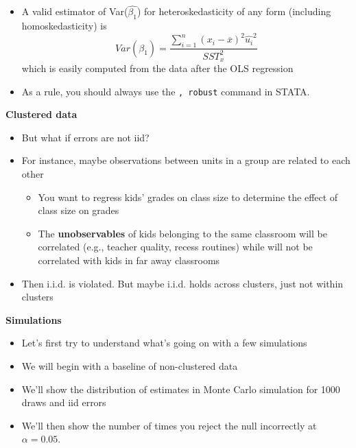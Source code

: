 \documentclass[notes=show]{beamer}
\begin{document}
\begin{frame}[plain]

	\begin{itemize}
	\item A valid estimator of Var($\widehat{\beta_1}$) for heteroskedasticity of any form (including homoskedasticity) is $$Var(\widehat{\beta_1}) = \frac{\sum_{i=1}^n (x_i - \overline{x})^2 \widehat{u_i}^2}{SST_x^2}$$which is easily computed from the data after the OLS regression
	\item As a rule, you should always use the \texttt{, robust} command in STATA. 
	\end{itemize}
\end{frame}


\begin{frame}[plain]

\begin{center}
\textbf{Clustered data}
\end{center}

\begin{itemize}
\item But what if errors are not iid?
\item For instance, maybe observations between units in a group are related to each other
	\begin{itemize}
	\item You want to regress kids' grades on class size to determine the effect of class size on grades
	\item The \textbf{unobservables} of kids belonging to the same classroom will be correlated (e.g., teacher quality, recess routines) while will not be correlated with kids in far away classrooms
	\end{itemize}
\item Then i.i.d. is violated.  But maybe i.i.d. holds across clusters, just not within clusters
\end{itemize}

\end{frame}

\begin{frame}[plain]
\begin{center}
\textbf{Simulations}
\end{center}

\begin{itemize}
\item Let's first try to understand what's going on with a few simulations
\item We will begin with a baseline of non-clustered data
\item We'll show the distribution of estimates in Monte Carlo simulation for 1000 draws and iid errors
\item We'll then show the number of times you reject the null incorrectly at $\alpha=0.05$.
\end{itemize}

\end{frame}
\end{document}
